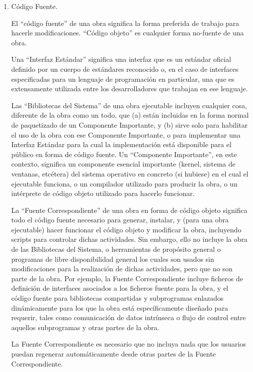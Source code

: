 \documentclass[11pt]{article}
\begin{document}
\begin{enumerate}
\item C\'{o}digo Fuente.

El ``c\'{o}digo fuente'' de una obra significa la forma preferida de
trabajo para hacerle modificaciones. ``C\'{o}digo objeto'' es cualquier 
forma no-fuente de una obra.

Una ``Interfaz Est\'{a}ndar'' significa una interfaz que es un est\'{a}ndar 
oficial definido por un cuerpo de est\'{a}ndares reconocido o, en el 
caso de interfaces especificadas para un lenguaje de programaci\'{o}n en
particular, una que es extensamente utilizada entre los
desarrolladores que trabajan en ese lenguaje.

Las ``Bibliotecas del Sistema'' de una obra ejecutable incluyen
cualquier cosa, diferente de la obra como un todo, que (a) est\'{a}n incluidas en la forma normal de paquetizado de un Componente Importante, y (b) sirve solo para habilitar el uso de la obra con ese Componente Importante, o para implementar una Interfaz Est\'{a}ndar
para la cual la implementaci\'{o}n est\'{a} disponible para el p\'{u}blico en
forma de c\'{o}digo fuente. Un ``Componente Importante'', en este
contexto, significa un componente esencial importante (kernel,
sistema de ventanas, etc\'{e}tera) del sistema operativo en concreto (si hubiese) en el cual el ejecutable funciona, o un compilador
utilizado para producir la obra, o un int\'{e}rprete de c\'{o}digo objeto
utilizado para hacerlo funcionar.

La ``Fuente Correspondiente'' de una obra en forma de c\'{o}digo
objeto significa todo el c\'{o}digo fuente necesario para generar,
instalar, y (para una obra ejecutable) hacer funcionar el c\'{o}digo
objeto y modificar la obra, incluyendo scripts para controlar
dichas actividades. Sin embargo, ello no incluye la obra de las Bibliotecas del Sistema, o herramientas de prop\'{o}sito general o
programas de libre disponibilidad general los cuales son usados sin
modificaciones para la realizaci\'{o}n de dichas actividades, pero que no son parte de la obra. Por ejemplo, la Fuente Correspondiente incluye ficheros de definici\'{o}n de interfaces asociados a los ficheros fuente para la obra, y el c\'{o}digo fuente para bibliotecas compartidas y subprogramas enlazados din\'{a}micamente para los que la obra est\'{a} espec\'{i}ficamente dise\~nado para requerir, tales como comunicaci\'{o}n de datos intr\'{i}nseca o flujo de control entre aquellos subprogramas y otras partes de la obra.

La Fuente Correspondiente es necesario que no incluya nada que los usuarios puedan regenerar autom\'{a}ticamente desde otras partes de la Fuente Correspondiente.


\end{enumerate}
\end{document}
